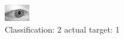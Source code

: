 \begin{figure}[h!]
\begin{center}
\includegraphics[width=0.60\columnwidth]{figures/ID2750_class_2_target_1.png}
\end{center}
\caption{ Classification: 2 actual target: 1}
\label{fig:ID2750_class_2_target_1}
\end{figure}
